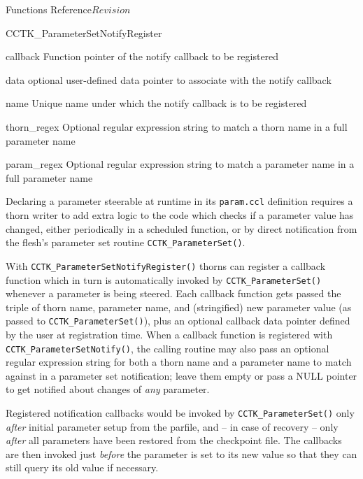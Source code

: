 \begin{cactuspart}{ Functions Reference}{}{$Revision$}
\begin{FunctionDescription}{CCTK\_ParameterSetNotifyRegister}
\begin{ParameterSection}
\begin{Parameter}{callback}
Function pointer of the notify callback to be registered
\end{Parameter}
\begin{Parameter}{data}
optional user-defined data pointer to associate with the notify callback
\end{Parameter}
\begin{Parameter}{name}
Unique name under which the notify callback is to be registered
\end{Parameter}
\begin{Parameter}{thorn\_regex}
Optional regular expression string to match a thorn name in a full parameter name
\end{Parameter}
\begin{Parameter}{param\_regex}
Optional regular expression string to match a parameter name in a full parameter name
\end{Parameter}
\end{ParameterSection}

\begin{Discussion}
Declaring a parameter steerable at runtime in its {\tt param.ccl} definition
requires a thorn writer to add extra logic to the code which checks
if a parameter value has changed, either periodically in a scheduled function,
or by direct notification from the flesh's parameter set routine
{\tt CCTK\_ParameterSet()}.

With {\tt CCTK\_ParameterSetNotifyRegister()} thorns can register a callback
function which in turn is automatically invoked by {\tt CCTK\_ParameterSet()}
whenever a parameter is being steered. 
Each callback function gets passed the triple of thorn name, parameter 
name, and (stringified) new parameter value (as passed to 
{\tt CCTK\_ParameterSet()}), plus an optional callback data pointer defined by 
the user at registration time. When a callback function is registered 
with {\tt CCTK\_ParameterSetNotify()}, the calling routine may also pass an 
optional regular expression string for both a thorn name and a parameter 
name to match against in a parameter set notification; leave them empty 
or pass a NULL pointer to get notified about changes of {\em any} parameter.

Registered notification callbacks would be invoked by 
{\tt CCTK\_ParameterSet()} only {\em after} initial parameter setup from the 
parfile, and -- in case of recovery -- only {\em after} all parameters have 
been restored from the checkpoint file. The callbacks are then invoked 
just {\em before} the parameter is set to its new value so that they can 
still query its old value if necessary.
\end{Discussion}


\end{FunctionDescription}
\end{cactuspart}
